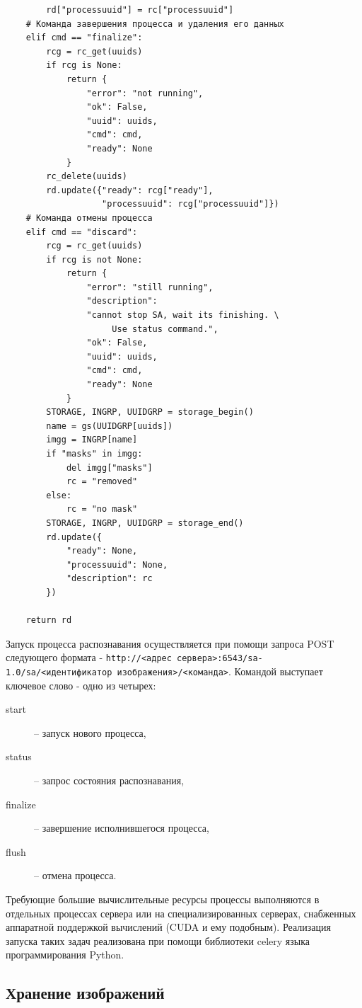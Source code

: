 \documentclass[732,14pt,final]{studrep}
\begin{document}
\begin{verbatim}
        rd["processuuid"] = rc["processuuid"]
    # Команда завершения процесса и удаления его данных
    elif cmd == "finalize":
        rcg = rc_get(uuids)
        if rcg is None:
            return {
                "error": "not running",
                "ok": False,
                "uuid": uuids,
                "cmd": cmd,
                "ready": None
            }
        rc_delete(uuids)
        rd.update({"ready": rcg["ready"],
                   "processuuid": rcg["processuuid"]})
    # Команда отмены процесса
    elif cmd == "discard":
        rcg = rc_get(uuids)
        if rcg is not None:
            return {
                "error": "still running",
                "description":
                "cannot stop SA, wait its finishing. \
                     Use status command.",
                "ok": False,
                "uuid": uuids,
                "cmd": cmd,
                "ready": None
            }
        STORAGE, INGRP, UUIDGRP = storage_begin()
        name = gs(UUIDGRP[uuids])
        imgg = INGRP[name]
        if "masks" in imgg:
            del imgg["masks"]
            rc = "removed"
        else:
            rc = "no mask"
        STORAGE, INGRP, UUIDGRP = storage_end()
        rd.update({
            "ready": None,
            "processuuid": None,
            "description": rc
        })

    return rd
\end{verbatim}

Запуск процесса распознавания осуществляется при помощи запроса POST следующего формата - \texttt{http://<адрес сервера>:6543/sa-1.0/sa/<идентификатор изображения>/<команда>}. Командой выступает ключевое слово - одно из четырех:
\begin{description}
  \item[start] -- запуск нового процесса,
  \item[status] -- запрос состояния распознавания,
  \item[finalize] -- завершение исполнившегося процесса,
  \item[flush] -- отмена процесса.
\end{description}
Требующие большие вычислительные ресурсы процессы выполняются в отдельных процессах сервера или на специализированных серверах, снабженных аппаратной поддержкой вычислений (CUDA и ему подобным). Реализация запуска таких задач реализована при помощи библиотеки celery языка программирования Python.

\subsection{Хранение изображений}
\end{document}
